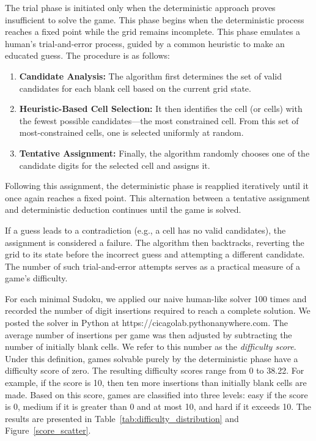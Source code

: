 \documentclass{article}
\theoremstyle{definition}
\begin{document}
The trial phase is initiated only when the deterministic approach proves insufficient to solve the game. This phase begins when the deterministic process reaches a fixed point while the grid remains incomplete. This phase emulates a human's trial-and-error process, guided by a common heuristic to make an educated guess. The procedure is as follows:
\begin{enumerate}
  \item \textbf{Candidate Analysis:} The algorithm first determines the set of valid candidates for each blank cell based on the current grid state.
  \item \textbf{Heuristic-Based Cell Selection:} It then identifies the cell (or cells) with the fewest possible candidates—the most constrained cell. From this set of most-constrained cells, one is selected uniformly at random.
  \item \textbf{Tentative Assignment:} Finally, the algorithm randomly chooses one of the candidate digits for the selected cell and assigns it.
\end{enumerate}
Following this assignment, the deterministic phase is reapplied iteratively until it once again reaches a fixed point. This alternation between a tentative assignment and deterministic deduction continues until the game is solved.

If a guess leads to a contradiction (e.g., a cell has no valid candidates), the assignment is considered a failure. The algorithm then backtracks, reverting the grid to its state before the incorrect guess and attempting a different candidate. The number of such trial-and-error attempts serves as a practical measure of a game's difficulty.

For each minimal Sudoku, we applied our naive human-like solver 100 times and recorded the number of digit insertions required to reach a complete solution. We posted the solver in Python at https://cicagolab.pythonanywhere.com.
The average number of insertions per game was then adjusted by subtracting the number of initially blank cells. We refer to this number as the \textit{difficulty score}. Under this definition, games solvable purely by the deterministic phase have a difficulty score of zero. The resulting difficulty scores range from 0 to 38.22. For example, if the score is 10, then ten more insertions than initially blank cells are made. Based on this score, games are classified into three levels: easy if the score is 0, medium if it is greater than 0 and at most 10, and hard if it exceeds 10.
The results are presented in Table~\ref{tab:difficulty_distribution} and Figure~\ref{score_scatter}.
\end{document}
